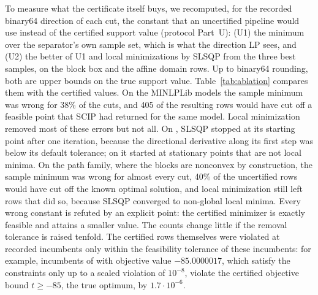 To measure what the certificate itself buys, we recomputed, for the recorded
binary64 direction of each cut, the constant that an uncertified pipeline
would use instead of the certified support value (protocol Part~U): (U1) the
minimum over the separator's own sample set, which is what the direction LP
sees, and (U2) the better of U1 and local minimizations by SLSQP from the
three best samples, on the block box and the affine domain rows. Up to
binary64 rounding, both are upper bounds on the true support value.
Table~\ref{tab:ablation} compares them with the certified values. On the
MINLPLib models the sample minimum was wrong for 38\% of the cuts, and 405 of
the resulting rows would have cut off a feasible point that SCIP had returned
for the same model. Local minimization removed most of these errors but not
all. On , SLSQP stopped at its starting point after one iteration,
because the directional derivative along its first step was below its default
tolerance; on  it started at stationary points
that are not local minima. On the path family, where the blocks are nonconvex
by construction, the sample minimum was wrong for almost every cut, 40\% of the
uncertified rows would have cut off the known optimal solution, and local
minimization still left rows that did so, because SLSQP converged to
non-global local minima. Every wrong constant is refuted by an explicit point:
the certified minimizer is exactly feasible and attains a smaller value. The
counts change little if the removal tolerance is raised tenfold. The certified
rows themselves were violated at recorded incumbents only within the
feasibility tolerance of these incumbents: for example, incumbents of
 with objective value $-85.0000017$, which satisfy the constraints
only up to a scaled violation of $10^{-8}$, violate the certified objective
bound $t\ge-85$, the true optimum, by $1.7\cdot10^{-6}$.
